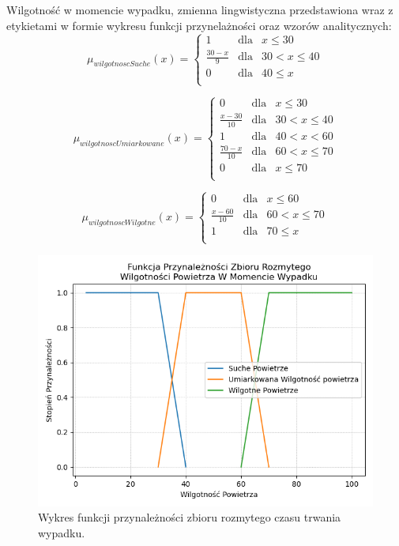 \documentclass{classrep}
\begin{document}
Wilgotność w momencie wypadku, zmienna lingwistyczna przedstawiona wraz z etykietami w formie wykresu funkcji przynelażności oraz wzorów analitycznych:
\begin{equation}
\mu _{wilgotnoscSuche}(x) =  \left\{ \begin{array}{rcl}
 1 & \mbox{dla} & x  \leq 30 \\
\frac{30 - x}{9} & \mbox{dla} & 30 < x \leq 40\\
0 & \mbox{dla} & 40 \leq x\\
\end{array}\right.
\end{equation}

\begin{equation}
\mu _{wilgotnoscUmiarkowane}(x) =  \left\{ \begin{array}{rcl}
 0 & \mbox{dla} & x  \leq 30 \\
\frac{x - 30}{10} & \mbox{dla} & 30 < x \leq 40\\
1 & \mbox{dla} & 40 < x < 60\\
\frac{70 - x}{10} & \mbox{dla} & 60 < x \leq 70\\
 0 & \mbox{dla} & x  \leq 70 \\
\end{array}\right.
\end{equation}

\begin{equation}
\mu _{wilgotnoscWilgotne}(x) =  \left\{ \begin{array}{rcl}
 0 & \mbox{dla} & x \leq 60 \\
\frac{x - 60}{10} & \mbox{dla} & 60 < x \leq 70\\
1 & \mbox{dla} & 70 \leq x\\
\end{array}\right.
\end{equation}

\begin{figure}[h!]
 \centering
 \includegraphics[width=14cm]{FunkcjaPrzynaleznosciWilgotnosc.png}
 \vspace{-0.3cm}
 \caption{Wykres funkcji przynależności zbioru rozmytego czasu trwania wypadku. }
 \label{rysunek do eksperymentu 1 wariantu 1}
\end{figure}
\newpage
\end{document}
